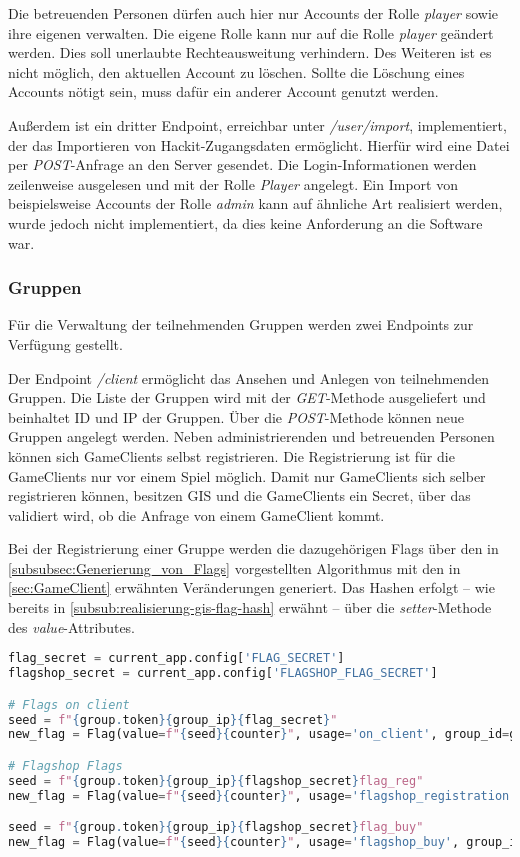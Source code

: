 Die betreuenden Personen dürfen auch hier nur Accounts der Rolle \textit{player} sowie ihre eigenen verwalten. Die eigene Rolle kann nur auf die Rolle \textit{player} geändert werden. Dies soll unerlaubte Rechteausweitung verhindern. Des Weiteren ist es nicht möglich, den aktuellen Account zu löschen. Sollte die Löschung eines Accounts nötigt sein, muss dafür ein anderer Account genutzt werden.

Außerdem ist ein dritter Endpoint, erreichbar unter \textit{/user/import}, implementiert, der das Importieren von Hackit-Zugangsdaten ermöglicht. Hierfür wird eine Datei per \textit{POST}-Anfrage an den Server gesendet. Die Login-Informationen werden zeilenweise ausgelesen und mit der Rolle \textit{Player} angelegt. Ein Import von beispielsweise Accounts der Rolle \textit{admin} kann auf ähnliche Art realisiert werden, wurde jedoch nicht implementiert, da dies keine Anforderung an die Software war.

\subsubsection{Gruppen}
Für die Verwaltung der teilnehmenden Gruppen werden zwei Endpoints zur Verfügung gestellt.

Der Endpoint \textit{/client} ermöglicht das Ansehen und Anlegen von teilnehmenden Gruppen.
Die Liste der Gruppen wird mit der \textit{GET}-Methode ausgeliefert und beinhaltet ID und IP der Gruppen. Über die \textit{POST}-Methode können neue Gruppen angelegt werden. Neben administrierenden und betreuenden Personen können sich GameClients selbst registrieren. Die Registrierung ist für die GameClients nur vor einem Spiel möglich. Damit nur GameClients sich selber registrieren können, besitzen GIS und die GameClients ein Secret, über das validiert wird, ob die Anfrage von einem GameClient kommt.

Bei der Registrierung einer Gruppe werden die dazugehörigen Flags über den in \autoref{subsubsec:Generierung_von_Flags} vorgestellten Algorithmus mit den in \autoref{sec:GameClient} erwähnten Veränderungen generiert. Das Hashen erfolgt -- wie bereits in \autoref{subsub:realisierung-gis-flag-hash} erwähnt -- über die \textit{setter}-Methode des \textit{value}-Attributes.

\begin{lstlisting}[language=Python, frame=single, caption={GIS Flaggenerierung}, captionpos=b, label={lst:gis-flag-gen}]
flag_secret = current_app.config['FLAG_SECRET']
flagshop_secret = current_app.config['FLAGSHOP_FLAG_SECRET']

# Flags on client
seed = f"{group.token}{group_ip}{flag_secret}"
new_flag = Flag(value=f"{seed}{counter}", usage='on_client', group_id=group.id)

# Flagshop Flags
seed = f"{group.token}{group_ip}{flagshop_secret}flag_reg"
new_flag = Flag(value=f"{seed}{counter}", usage='flagshop_registration', group_id=group.id)

seed = f"{group.token}{group_ip}{flagshop_secret}flag_buy"
new_flag = Flag(value=f"{seed}{counter}", usage='flagshop_buy', group_id=group.id)
\end{lstlisting}

